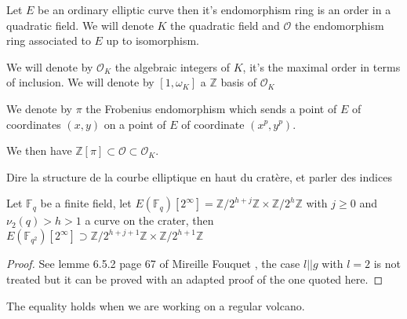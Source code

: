 \begin{prop}
Let $E$ be an ordinary elliptic curve then it's endomorphism ring is an order in a quadratic field. We will denote $K$ the quadratic field and $\mathcal{O}$ the endomorphism ring associated to $E$ up to isomorphism.
\end{prop}

\begin{defi}
We will denote by $\mathcal{O}_K$ the algebraic integers of $K$, it's the maximal order in terms of inclusion. We will denote by $[1,\omega_K]$ a $\mathbb{Z}$ basis of $\mathcal{O}_K$
\end{defi}

\begin{defi}
We denote by $\pi$ the Frobenius endomorphism which sends a point of $E$ of coordinates $(x,y)$ on a point of $E$ of coordinate $(x^p,y^p)$.
\end{defi}

We then have $\mathbb{Z}[\pi] \subset \mathcal{O} \subset \mathcal{O}_K$.

Dire la structure de la courbe elliptique en haut du cratère, et parler des indices

\begin{prop} \label{structelevation}
Let $\mathbb{F}_q$ be a finite field, let $E(\mathbb{F}_q)[2^{\infty}]=\mathbb{Z}/2^{h+j}\mathbb{Z} \times \mathbb{Z}/2^{h}\mathbb{Z}$ with $ j \geqslant 0$ and $\nu_2(q)>h>1$ a curve on the crater, then $E(\mathbb{F}_{q^2})[2^{\infty}] \supset \mathbb{Z}/2^{h+j+1}\mathbb{Z} \times \mathbb{Z}/2^{h+1}\mathbb{Z}$
\end{prop}

\begin{proof}
See lemme 6.5.2 page 67  of Mireille Fouquet \cite{Fouquet01}, the case $l ||g$ with $l=2$ is not treated but it can be proved with an adapted proof of the one quoted here.
\end{proof}

\begin{rem}
The equality holds when we are working on a regular volcano.
\end{rem}
